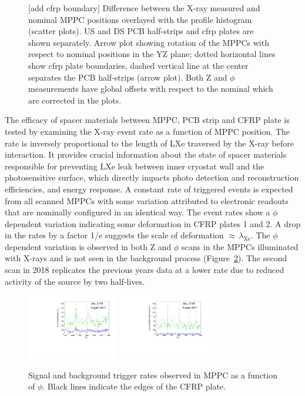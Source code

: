 \begin{figure}
\caption{[add cfrp boundary]
Difference between the X-ray measured and nominal MPPC positions
overlayed with the profile histogram (scatter plots).
US and DS PCB half-strips and cfrp plates are shown separately.
Arrow plot showing rotation of the MPPCs with respect to nominal
positions in the YZ plane; dotted horizontal lines show cfrp plate boundaries,
dashed vertical line at the center separates the PCB half-strips (arrow plot).
Both Z and $\phi$ measurements have global offsets with respect to the 
nominal which are corrected in the plots.
}
\label{fig:rotation}
\end{figure}

The efficacy of spacer materials between MPPC, PCB strip and CFRP
plate is tested by examining the X-ray event rate as a function of
MPPC position. The rate is inversely proportional to the length of LXe
traversed by the X-ray before interaction.  It provides crucial
information about the state of spacer materials responsible for
preventing LXe leak between inner cryostat wall and the photosensitive
surface, which directly impacts photo detection and reconstruction
efficiencies, and energy response.  A constant rate of triggered
events is expected from all scanned MPPCs with some variation
attributed to electronic readouts that are nominally configured in an
identical way.  The event rates show a $\phi$ dependent variation
indicating some deformation in CFRP plates 1 and 2.  A drop in the
rates by a factor 1/e suggests the scale of deformation
$\approx\,\lambda_{\mathrm{Xe}}$.  The $\phi$ dependent variation is
observed in both Z and $\phi$ scans in the MPPCs illuminated with
X-rays and is not seen in the background process
(Figure~\ref{fig:ratesvszphi}).  The second scan in 2018 replicates
the previous years data at a lower rate due to reduced activity of the
source by two half-lives.  
\begin{figure}[]
\includegraphics[width=4cm]{plots/2018/cEventRate_1718}
\includegraphics[width=4cm]{plots/2018/cBkgRate_1718} \caption{Signal
and background trigger rates observed in MPPC as a function of $\phi$.
Black lines indicate the edges of the CFRP plate.}
\label{fig:ratesvszphi} \end{figure}



